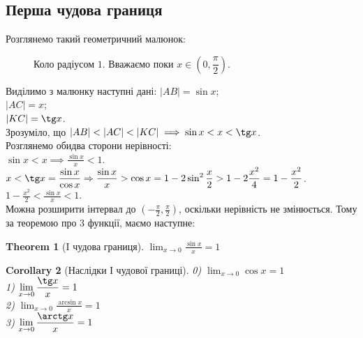 \documentclass[a4paper, 14pt]{article}
\def\huge{\displaystyle}
\theoremstyle{theoremdd}
\newtheorem{theorem}{Theorem}[subsection]
\theoremstyle{theoremdd}
\theoremstyle{theoremdd}
\theoremstyle{theoremdd}
\theoremstyle{theoremdd}
\theoremstyle{theoremdd}
\theoremstyle{theoremdd}
\theoremstyle{theoremdd}
\newtheorem{corollary}[theorem]{Corollary}
\begin{document}
\subsection{Перша чудова границя}
Розглянемо такий геометричний малюнок:\\
\begin{figure}[H]
\centering
{
}
\caption*{Коло радіусом $1$. Вважаємо поки $x \in \left(0, \dfrac{\pi}{2} \right)$.}
\end{figure}
Виділимо з малюнку наступні дані:
	$|AB|=\sin x$;\\
	$|AC|=x$;\\
	$|KC|=\tg x$.\\
	Зрозуміло, що $|AB|<|AC|<|KC| \implies \sin x < x < \tg x$.\\
	Розглянемо обидва сторони нерівності:\\
	$\displaystyle \sin x < x \implies \frac{\sin x}{x} < 1$.\\
	$\displaystyle x < \tg x = \frac{\sin x}{\cos x} \Rightarrow \frac{\sin x}{x} > \cos x = 1-2 \sin^2 \frac{x}{2} > 1 - 2 \frac{x^2}{4} = 1 - \frac{x^2}{2}$.\\
	$\displaystyle 1- \frac{x^2}{2}<\frac{\sin x}{x} < 1$.\\
Можна розширити інтервал до $\huge \left(-\frac{\pi}{2},\frac{\pi}{2} \right)$, оскільки нерівність не змінюється. Тому за теоремою про 3 функції, маємо наступне:
\begin{theorem}[I чудова границя]
$\huge \lim_{x \to 0} \frac{\sin x}{x} = 1$
\end{theorem}

\begin{corollary}[Наслідки І чудової границі]
0) $\huge\lim_{x \to 0} \cos x = 1$\\
1) $\huge \lim_{x \to 0} \frac{\tg x}{x} = 1$\\
2) $\huge \lim_{x \to 0} \frac{\arcsin x}{x} = 1$\\
3) $\huge \lim_{x \to 0} \frac{\arctg x}{x} = 1$
\end{corollary}
\end{document}
